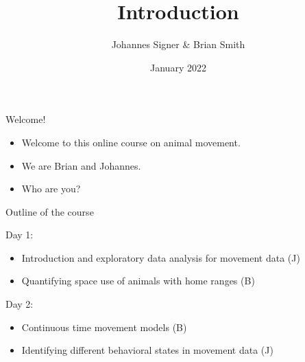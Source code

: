 \documentclass[ignorenonframetext,,t]{beamer}
\title{Introduction}
\author{Johannes Signer \& Brian Smith}
\date{January 2022}
\providecommand{\tightlist}{%
\setlength{\itemsep}{0pt}\setlength{\parskip}{0pt}}
\providecommand{\tightlist}{%
\setlength{\itemsep}{0pt}\setlength{\parskip}{0pt}}
\renewcommand{\tightlist}{\setlength{\itemsep}{1.4ex}\setlength{\parskip}{0pt}}
\begin{document}
\frame{\titlepage}



\begin{frame}{Welcome!}
\protect\hypertarget{welcome}{}
\begin{itemize}
\tightlist
\item
  Welcome to this online course on animal movement.
\item
  We are Brian and Johannes.
\item
  Who are you?
\end{itemize}
\end{frame}

\begin{frame}{Outline of the course}
\protect\hypertarget{outline-of-the-course}{}
\begin{block}{Day 1:}
\protect\hypertarget{day-1}{}
\begin{itemize}
\tightlist
\item
  Introduction and exploratory data analysis for movement data (J)
\item
  Quantifying space use of animals with home ranges (B)
\end{itemize}
\end{block}

\begin{block}{Day 2:}
\protect\hypertarget{day-2}{}
\begin{itemize}
\tightlist
\item
  Continuous time movement models (B)
\item
  Identifying different behavioral states in movement data (J)
\end{itemize}
\end{block}
\end{frame}
\end{document}

